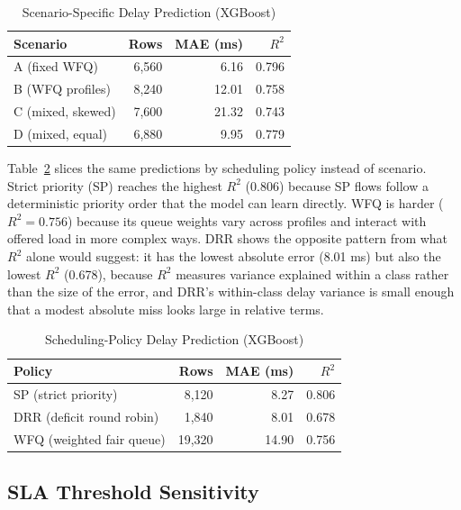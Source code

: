 \documentclass[conference]{IEEEtran}
\begin{document}
\begin{table}[t]
\caption{Scenario-Specific Delay Prediction (XGBoost)}
\label{tab:scenario}
\centering
\setlength{\tabcolsep}{4pt}
\begin{tabular}{lrrr}
\toprule
Scenario & Rows & MAE (ms) & $R^2$ \\
\midrule
A (fixed WFQ)      & 6,560 & 6.16  & 0.796 \\
B (WFQ profiles)   & 8,240 & 12.01 & 0.758 \\
C (mixed, skewed)  & 7,600 & 21.32 & 0.743 \\
D (mixed, equal)   & 6,880 & 9.95  & 0.779 \\
\bottomrule
\end{tabular}
\end{table}

Table~\ref{tab:policy} slices the same predictions by scheduling policy instead of scenario. Strict priority (SP) reaches the highest $R^2$ (0.806) because SP flows follow a deterministic priority order that the model can learn directly. WFQ is harder ($R^2=0.756$) because its queue weights vary across profiles and interact with offered load in more complex ways. DRR shows the opposite pattern from what $R^2$ alone would suggest: it has the lowest absolute error (8.01 ms) but also the lowest $R^2$ (0.678), because $R^2$ measures variance explained within a class rather than the size of the error, and DRR's within-class delay variance is small enough that a modest absolute miss looks large in relative terms.

\begin{table}[t]
\caption{Scheduling-Policy Delay Prediction (XGBoost)}
\label{tab:policy}
\centering
\setlength{\tabcolsep}{4pt}
\begin{tabular}{lrrr}
\toprule
Policy & Rows & MAE (ms) & $R^2$ \\
\midrule
SP (strict priority)      & 8,120  & 8.27  & 0.806 \\
DRR (deficit round robin) & 1,840  & 8.01  & 0.678 \\
WFQ (weighted fair queue) & 19,320 & 14.90 & 0.756 \\
\bottomrule
\end{tabular}
\end{table}

\subsection{SLA Threshold Sensitivity}
\label{sec:threshold}
\end{document}
